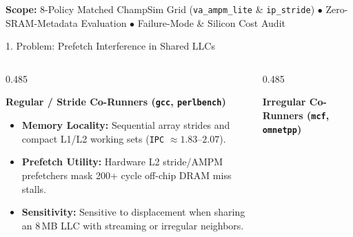 \documentclass[aspectratio=169, 10pt]{beamer}
\begin{document}
\begin{frame}[plain]
  \vspace{0.30cm}
  \begin{tcolorbox}[cleanpanel, top=1.4mm, bottom=1.4mm]
    \centering\scriptsize\color{TextMuted}
    \textbf{\color{Obsidian}Scope:} 8-Policy Matched ChampSim Grid (\texttt{va\_ampm\_lite} \& \texttt{ip\_stride}) $\bullet$ Zero-SRAM-Metadata Evaluation $\bullet$ Failure-Mode \& Silicon Cost Audit
  \end{tcolorbox}
\end{frame}

\begin{frame}{1. Problem: Prefetch Interference in Shared LLCs}
  \vspace{-0.12cm}
  \begin{columns}[t, onlytextwidth]
    \begin{column}{0.485\textwidth}
      \begin{tcolorbox}[tealpanel]
        {\footnotesize\textbf{\color{Obsidian}Regular / Stride Co-Runners (\texttt{gcc}, \texttt{perlbench})}}\par\vspace{0.08cm}
        \begin{itemize}\setlength{\itemsep}{0.22em}\scriptsize
          \item \textbf{Memory Locality:} Sequential array strides and compact L1/L2 working sets (\texttt{IPC} $\approx 1.83\text{--}2.07$).
          \item \textbf{Prefetch Utility:} Hardware L2 stride/AMPM prefetchers mask 200+ cycle off-chip DRAM miss stalls.
          \item \textbf{Sensitivity:} Sensitive to displacement when sharing an 8\,MB LLC with streaming or irregular neighbors.
        \end{itemize}
      \end{tcolorbox}
    \end{column}%
    \hfill%
    \begin{column}{0.485\textwidth}
      \begin{tcolorbox}[archpanel]
        {\footnotesize\textbf{\color{Obsidian}Irregular Co-Runners (\texttt{mcf}, \texttt{omnetpp})}}\par\vspace{0.08cm}
        \begin{itemize}\setlength{\itemsep}{0.22em}\scriptsize

\end{itemize}
\end{tcolorbox}
\end{column}
\end{columns}
\end{frame}
\end{document}
